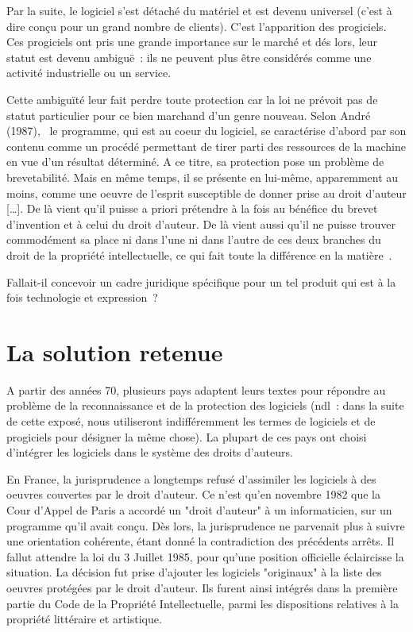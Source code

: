 \documentclass{report}
\begin{document}
Par la suite, le logiciel s'est détaché du matériel et est devenu universel (c'est à dire conçu pour un grand nombre de clients). C'est l'apparition des progiciels. Ces progiciels ont pris une grande importance sur le marché et dés lors, leur statut est devenu ambiguë~: ils ne peuvent plus être considérés comme une activité industrielle ou un service.

Cette ambiguïté leur fait perdre toute protection car la loi ne prévoit pas de statut particulier pour ce bien marchand d'un genre nouveau. Selon André  (1987), \og~le programme, qui est au coeur du logiciel, se caractérise d'abord par son contenu comme un procédé permettant de tirer parti des ressources de la machine en vue d'un résultat déterminé. A ce titre, sa protection pose un problème de brevetabilité. Mais en même temps, il se présente en lui-même, apparemment au moins, comme une oeuvre de l'esprit susceptible de donner prise au droit d'auteur [\dots]. De là vient qu'il puisse a priori prétendre à la fois au bénéfice du brevet d'invention et à celui du droit d'auteur. De là vient aussi qu'il ne puisse trouver commodément sa place ni dans l'une ni dans l'autre de ces deux branches du droit de la propriété intellectuelle, ce qui fait toute la différence en la matière~\fg.

Fallait-il concevoir un cadre juridique spécifique pour un tel produit qui est à la fois technologie et expression~?

\section{La solution retenue}
A partir des années 70, plusieurs pays adaptent leurs textes pour répondre au problème de la reconnaissance et de la protection des logiciels (ndl~: dans la suite de cette exposé, nous utiliseront indifféremment les termes de logiciels et de progiciels pour désigner la même chose). La plupart de ces pays ont choisi d'intégrer les logiciels dans le système des droits d'auteurs.

En France, la jurisprudence a longtemps refusé d'assimiler les logiciels à des oeuvres couvertes par le droit d'auteur. Ce n'est qu'en novembre 1982 que la Cour d'Appel de Paris a accordé un "droit d'auteur" à un informaticien, sur un programme qu'il avait conçu. Dès lors, la jurisprudence ne parvenait plus à suivre une orientation cohérente, étant donné la contradiction des précédents arrêts. Il fallut attendre la loi du 3 Juillet 1985, pour qu'une position officielle éclaircisse la situation. La décision fut prise d'ajouter les logiciels "originaux" à la liste des oeuvres protégées par le droit d'auteur. Ils furent ainsi intégrés dans la première partie du Code de la Propriété Intellectuelle, parmi les dispositions relatives à la propriété littéraire et artistique.
\end{document}
